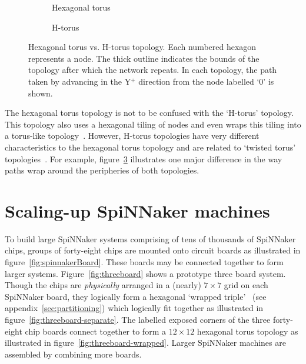		\begin{figure}
			\center
			\begin{subfigure}[b]{0.45\linewidth}
				\center
				\caption{Hexagonal torus}
				\label{fig:topo-compare-hexagonal-torus}
			\end{subfigure}
			\begin{subfigure}[b]{0.45\linewidth}
				\center
				\caption{H-torus}
				\label{fig:topo-compare-h-torus}
			\end{subfigure}
			
			\caption[Hexagonal torus vs. H-torus topology.]%
			{Hexagonal torus vs. H-torus topology. Each numbered hexagon
			represents a node. The thick outline indicates the bounds of the
			topology after which the network repeats. In each topology, the path
			taken by advancing in the Y$^+$ direction from the node labelled `0' is
			shown.}
			\label{fig:topo-compare}
		\end{figure}
		
		\label{sec:hex-vs-h-torus}
		
		The hexagonal torus topology is not to be confused with the `H-torus'
		topology. This topology also uses a hexagonal tiling of nodes and even
		wraps this tiling into a torus-like topology~\cite{zhao08}. However,
		H-torus topologies have very different characteristics to the hexagonal
		torus topology and are related to `twisted torus'
		topologies~\cite{camara10}. For example, figure~\ref{fig:topo-compare}
		illustrates one major difference in the way paths wrap around the
		peripheries of both topologies.
	
	\section{Scaling-up SpiNNaker machines}
		
		To build large SpiNNaker systems comprising of tens of thousands of
		SpiNNaker chips, groups of forty-eight chips are mounted onto circuit
		boards as illustrated in figure~\ref{fig:spinnakerBoard}. These boards may
		be connected together to form larger systems.  Figure~\ref{fig:threeboard}
		shows a prototype three board system. Though the chips are
		\emph{physically} arranged in a (nearly) $7\times7$ grid on each SpiNNaker
		board, they logically form a hexagonal `wrapped
		triple'~\cite{davidsonWiring} (see appendix~\ref{sec:partitioning}) which
		logically fit together as illustrated in
		figure~\ref{fig:threeboard-separate}. The labelled exposed corners of the
		three forty-eight chip boards connect together to form a $12\times12$
		hexagonal torus topology as illustrated in
		figure~\ref{fig:threeboard-wrapped}. Larger SpiNNaker machines are
		assembled by combining more boards.
		
